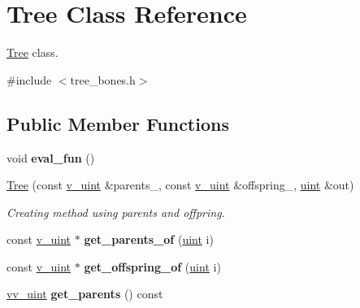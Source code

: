 \hypertarget{classTree}{}\section{Tree Class Reference}
\label{classTree}


\hyperlink{classTree}{Tree} class.  




{\ttfamily \#include $<$tree\+\_\+bones.\+h$>$}

\subsection*{Public Member Functions}
\begin{DoxyCompactItemize}
\item 
void {\bfseries eval\+\_\+fun} ()\hypertarget{classTree_a5a24565d179a3bd6edae1ff323060a93}{}\label{classTree_a5a24565d179a3bd6edae1ff323060a93}

\item 
\hyperlink{classTree_a0f964d9ba9834822d3e18946a5361839}{Tree} (const \hyperlink{typedefs_8h_ad56dde311aef1af823f4351451e8a381}{v\+\_\+uint} \&parents\+\_\+, const \hyperlink{typedefs_8h_ad56dde311aef1af823f4351451e8a381}{v\+\_\+uint} \&offspring\+\_\+, \hyperlink{typedefs_8h_a91ad9478d81a7aaf2593e8d9c3d06a14}{uint} \&out)
\begin{DoxyCompactList}\small\item\em Creating method using parents and offpring. \end{DoxyCompactList}\item 
const \hyperlink{typedefs_8h_ad56dde311aef1af823f4351451e8a381}{v\+\_\+uint} $\ast$ {\bfseries get\+\_\+parents\+\_\+of} (\hyperlink{typedefs_8h_a91ad9478d81a7aaf2593e8d9c3d06a14}{uint} i)\hypertarget{classTree_adb9bede67bc875b58bb240d4c5421821}{}\label{classTree_adb9bede67bc875b58bb240d4c5421821}

\item 
const \hyperlink{typedefs_8h_ad56dde311aef1af823f4351451e8a381}{v\+\_\+uint} $\ast$ {\bfseries get\+\_\+offspring\+\_\+of} (\hyperlink{typedefs_8h_a91ad9478d81a7aaf2593e8d9c3d06a14}{uint} i)\hypertarget{classTree_a02c43c8a0bb0e7be7bf33436a8c05b30}{}\label{classTree_a02c43c8a0bb0e7be7bf33436a8c05b30}

\item 
\hyperlink{typedefs_8h_a889a1eb698faf8cdf9160d65a20d316d}{vv\+\_\+uint} {\bfseries get\+\_\+parents} () const \hypertarget{classTree_ae4f36e6d306946015965a7d9bc577a2a}{}\label{classTree_ae4f36e6d306946015965a7d9bc577a2a}


\end{DoxyCompactItemize}
